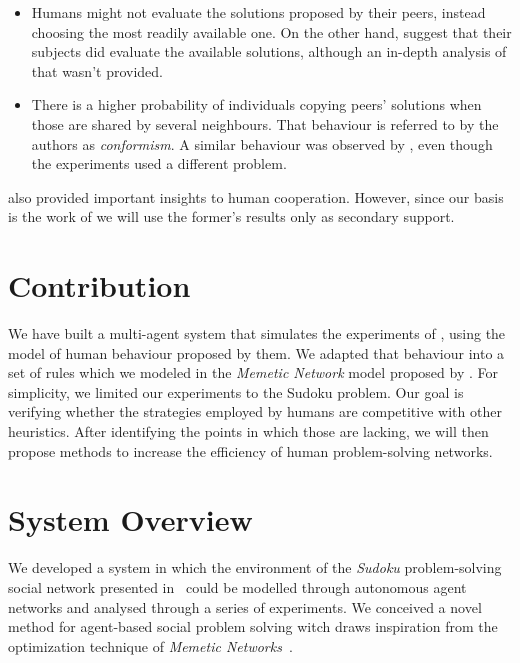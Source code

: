 \documentclass[letterpaper]{article}
\begin{document}
\begin{itemize}
	\item Humans might not evaluate the solutions proposed by their peers, instead choosing the most readily available one. On the other hand, \cite{mason:collablearnet} suggest that their subjects did evaluate the available solutions, although an in-depth analysis of that wasn't provided.
	\item There is a higher probability of individuals copying peers' solutions when those are shared by several neighbours. That behaviour is referred to by the authors as \emph{conformism}. A similar behaviour was observed by \cite{mason:collablearnet}, even though the experiments used a different problem.
\end{itemize}

\cite{mason:collablearnet} also provided important insights to human cooperation. However, since our basis is the work of \cite{farenzena:collabem} we will use the former's results only as secondary support.

\section{Contribution}

We have built a multi-agent system that simulates the experiments of \cite{farenzena:collabem}, using the model of human behaviour proposed by them. We adapted that behaviour into a set of rules which we modeled in the \emph{Memetic Network} model proposed by \cite{lamb:memenet}. For simplicity, we limited our experiments to the Sudoku problem. Our goal is verifying whether the strategies employed by humans are competitive with other heuristics. After identifying the points in which those are lacking, we will then propose methods to increase the efficiency of human problem-solving networks.

\section{System Overview}

We developed a system in which the environment of the {\em Sudoku} problem-solving social network presented in~\cite{farenzena:collabem} could be modelled through autonomous agent networks and analysed through a series of experiments. We conceived a novel method for agent-based social problem solving witch draws inspiration from the optimization technique of {\em Memetic Networks}~\cite{lamb:memenet}.
\end{document}
